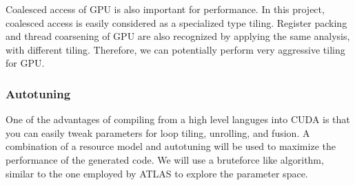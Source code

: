 Coalesced access of GPU is also important for performance. In this
project, coalesced access is easily considered as a specialized type
tiling. Register packing and thread coarsening of GPU are also
recognized by applying the same analysis, with different tiling.
Therefore, we can potentially perform very aggressive tiling for GPU.

\subsubsection{Autotuning}\label{autotuning}

One of the advantages of compiling from a high level languges into CUDA
is that you can easily tweak parameters for loop tiling, unrolling, and
fusion. A combination of a resource model and autotuning will be used to
maximize the performance of the generated code. We will use a bruteforce
like algorithm, similar to the one employed by ATLAS to explore the
parameter space.